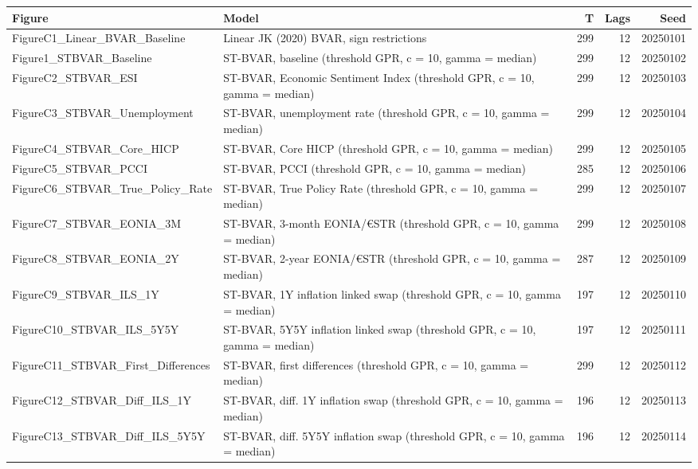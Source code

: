 \begin{table}[ht]
\centering
\begingroup\scriptsize
\begin{tabular}{lp{6cm}rrr}
  \hline
Figure & Model & T & Lags & Seed \\ 
  \hline
FigureC1\_Linear\_BVAR\_Baseline & Linear JK (2020) BVAR, sign restrictions & 299 & 12 & 20250101 \\ 
  Figure1\_STBVAR\_Baseline & ST-BVAR, baseline (threshold GPR, c = 10, gamma = median) & 299 & 12 & 20250102 \\ 
  FigureC2\_STBVAR\_ESI & ST-BVAR, Economic Sentiment Index (threshold GPR, c = 10, gamma = median) & 299 & 12 & 20250103 \\ 
  FigureC3\_STBVAR\_Unemployment & ST-BVAR, unemployment rate (threshold GPR, c = 10, gamma = median) & 299 & 12 & 20250104 \\ 
  FigureC4\_STBVAR\_Core\_HICP & ST-BVAR, Core HICP (threshold GPR, c = 10, gamma = median) & 299 & 12 & 20250105 \\ 
  FigureC5\_STBVAR\_PCCI & ST-BVAR, PCCI (threshold GPR, c = 10, gamma = median) & 285 & 12 & 20250106 \\ 
  FigureC6\_STBVAR\_True\_Policy\_Rate & ST-BVAR, True Policy Rate (threshold GPR, c = 10, gamma = median) & 299 & 12 & 20250107 \\ 
  FigureC7\_STBVAR\_EONIA\_3M & ST-BVAR, 3-month EONIA/€STR (threshold GPR, c = 10, gamma = median) & 299 & 12 & 20250108 \\ 
  FigureC8\_STBVAR\_EONIA\_2Y & ST-BVAR, 2-year EONIA/€STR (threshold GPR, c = 10, gamma = median) & 287 & 12 & 20250109 \\ 
  FigureC9\_STBVAR\_ILS\_1Y & ST-BVAR, 1Y inflation linked swap (threshold GPR, c = 10, gamma = median) & 197 & 12 & 20250110 \\ 
  FigureC10\_STBVAR\_ILS\_5Y5Y & ST-BVAR, 5Y5Y inflation linked swap (threshold GPR, c = 10, gamma = median) & 197 & 12 & 20250111 \\ 
  FigureC11\_STBVAR\_First\_Differences & ST-BVAR, first differences (threshold GPR, c = 10, gamma = median) & 299 & 12 & 20250112 \\ 
  FigureC12\_STBVAR\_Diff\_ILS\_1Y & ST-BVAR, diff. 1Y inflation swap (threshold GPR, c = 10, gamma = median) & 196 & 12 & 20250113 \\ 
  FigureC13\_STBVAR\_Diff\_ILS\_5Y5Y & ST-BVAR, diff. 5Y5Y inflation swap (threshold GPR, c = 10, gamma = median) & 196 & 12 & 20250114 \\ 

\end{tabular}
\end{table}
